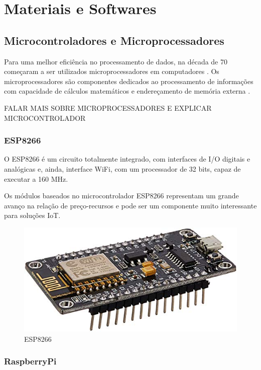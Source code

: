 \chapter{Materiais e Softwares}

\section{Microcontroladores e Microprocessadores}

Para uma melhor eficiência no processamento de dados, na década de 70
começaram a ser utilizados microprocessadores em computadores \cite{martins2005sistemas}. Os microprocessadores são componentes dedicados ao processamento de informações com
capacidade de cálculos matemáticos e endereçamento de memória externa \cite{chase2007sistemas}.

FALAR MAIS SOBRE MICROPROCESSADORES E EXPLICAR MICROCONTROLADOR

\subsection{ESP8266}

O ESP8266 é um circuito totalmente integrado, com interfaces de I/O digitais e analógicas e, ainda, interface WiFi, com um processador de 32 bits, capaz de executar a 160 MHz.

Os módulos baseados no microcontrolador ESP8266 representam um grande avanço na relação de preço-recursos e pode ser um componente muito interessante para soluções IoT.\cite {de2017internet}

\begin{figure}[htbp]
		\centering
		\includegraphics[scale=0.5]{figuras/esp8266_.jpg}
		\caption{ESP8266}
		\label{fig:01}
\end{figure}

\subsection{RaspberryPi}

